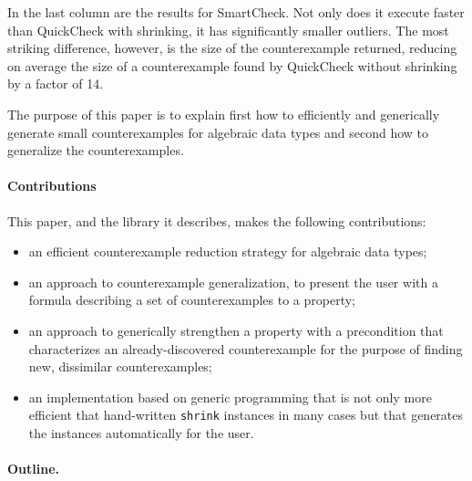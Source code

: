 \documentclass[10pt]{sigplanconf}
\newcommand{\ttp}[1]{\texttt{#1}}
\begin{document}
In the last column are the results for SmartCheck.  Not only does it execute
faster than QuickCheck with shrinking, it has significantly smaller outliers.
The most striking difference, however, is the size of the counterexample
returned, reducing on average the size of a counterexample found by QuickCheck
without shrinking by a factor of 14.

The purpose of this paper is to explain first how to efficiently and generically
generate small counterexamples for algebraic data types and second how to
generalize the counterexamples.

\paragraph{Contributions}
This paper, and the library it describes, makes the following contributions:

\begin{itemize}

\item an efficient counterexample reduction strategy for algebraic
  data types;

\item an approach to counterexample generalization, to present the
  user with a formula describing a set of counterexamples to a property;

\item an approach to generically strengthen a property with a precondition that
  characterizes an already-discovered counterexample for the purpose of finding
  new, dissimilar counterexamples;

\item an implementation based on generic programming that is not only more
  efficient that hand-written \ttp{shrink} instances in many cases but that
  generates the instances automatically for the user.

\end{itemize}


\paragraph{Outline.}
\end{document}
